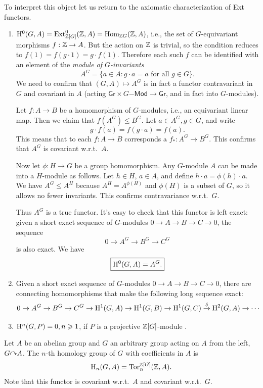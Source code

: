 To interpret this object let us return to the axiomatic characterization of Ext functors.

\begin{enumerate}
    \item $\mathrm{H}^0(G,A)=\operatorname{Ext}^0_{\mathbb{Z}[G]}(\mathbb{Z},A)=\operatorname{Hom}_{\mathbb{Z} G}(\mathbb{Z},A)$, i.e., the set of $G$-equivariant morphisms $f:\mathbb{Z}\to A$. But the action on $\mathbb{Z}$ is trivial, so the condition reduces to $f(1)=f(g\cdot 1)=g\cdot f(1)$. Therefore each such $f$ can be identified with an element of the \emph{module of $G$-invariants}
    \[A^G=\{a\in A:g\cdot a=a\text{ for all }g\in G\}.\]
    We need to confirm that $(G,A)\mapsto A^G$ is in fact a functor contravariant in $G$ and covariant in $A$ (acting $\mathsf{Gr}\times G\mathsf{-Mod}\to \mathsf{Gr}$, and in fact into $G$-modules).

    Let $f:A\to B$ be a homomorphism of $G$-modules, i.e., an equivariant linear map. Then we claim that $f(A^G)\leq B^G$. Let $a\in A^G, g\in G$, and write
    \[g\cdot f(a)=f(g\cdot a)=f(a).\]
    This means that to each $f:A\to B$ corresponds a $f_\ast :A^G\to B^G$. This confirms that $A^G$ is covariant w.r.t.\ $A$.

    Now let $\phi:H\to G$ be a group homomorphism. Any $G$-module $A$ can be made into a $H$-module as follows. Let $h\in H$, $a\in A$, and define $h\cdot a=\phi(h)\cdot a$. We have $A^G\leq A^H$ because $A^H=A^{\phi(H)}$ and $\phi(H)$ is a subset of $G$, so it allows no fewer invariants. This confirms contravariance w.r.t.\ $G$. 
    
    Thus $A^G$ is a true functor. It's easy to check that this functor is left exact: given a short exact sequence of $G$-modules $0\to A\to B\to C\to 0$, the sequence
    \[0\to A^G\to B^G\to C^G\]
    is also exact. We have
    \[\boxed{\mathrm{H}^0(G,A)=A^G.}\]
    
    \item Given a short exact sequence of $G$-modules $0\to A\to B\to C\to 0$, there are connecting homomorphisms that make the following long sequence exact:
    \[0\to A^G\to B^G\to C^G\to \mathrm{H}^1(G,A)\to \mathrm{H}^1(G,B)\to \mathrm{H}^1(G,C)\overset{\delta}{\to}\mathrm{H}^2(G,A)\to\cdots \]

    \item $\mathrm{H}^n(G,P)=0, n\geqslant 1$, if $P$ is a projective $\mathbb{Z}[G]$-module .
\end{enumerate}


\begin{defn}
    Let $A$ be an abelian group and $G$ an arbitrary group acting on $A$ from the left, $G\acts A$. The $n$-th homology group of $G$ with coefficients in $A$ is
    \[\mathrm{H}_n(G,A)=\operatorname{Tor}^{\mathbb{Z}[G]}_n(\mathbb{Z},A).\]
    Note that this functor is covariant w.r.t.\ $A$ and covariant w.r.t.\ $G$.
\end{defn}

